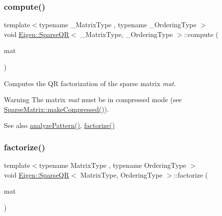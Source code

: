 \subsubsection{\texorpdfstring{compute()}{compute()}}
{\footnotesize\ttfamily template$<$typename \+\_\+\+Matrix\+Type , typename \+\_\+\+Ordering\+Type $>$ \\
void \mbox{\hyperlink{class_eigen_1_1_sparse_q_r}{Eigen\+::\+Sparse\+QR}}$<$ \+\_\+\+Matrix\+Type, \+\_\+\+Ordering\+Type $>$\+::compute (\begin{DoxyParamCaption}\item[{const Matrix\+Type \&}]{mat }\end{DoxyParamCaption})\hspace{0.3cm}{\ttfamily [inline]}}

Computes the QR factorization of the sparse matrix {\itshape mat}.

\begin{DoxyWarning}{Warning}
The matrix {\itshape mat} must be in compressed mode (see \mbox{\hyperlink{class_eigen_1_1_sparse_matrix_a5ff54ffc10296f9466dc81fa888733fd}{Sparse\+Matrix\+::make\+Compressed()}}).
\end{DoxyWarning}
\begin{DoxySeeAlso}{See also}
\mbox{\hyperlink{class_eigen_1_1_sparse_q_r_a4b425ddb1358c914d764cde48853a4f6}{analyze\+Pattern()}}, \mbox{\hyperlink{class_eigen_1_1_sparse_q_r_a55a34bacf05bd30a1dacbccad9f03c6d}{factorize()}} 
\end{DoxySeeAlso}
\mbox{\label{class_eigen_1_1_sparse_q_r_a55a34bacf05bd30a1dacbccad9f03c6d}} 
\subsubsection{\texorpdfstring{factorize()}{factorize()}}
{\footnotesize\ttfamily template$<$typename Matrix\+Type , typename Ordering\+Type $>$ \\
void \mbox{\hyperlink{class_eigen_1_1_sparse_q_r}{Eigen\+::\+Sparse\+QR}}$<$ Matrix\+Type, Ordering\+Type $>$\+::factorize (\begin{DoxyParamCaption}\item[{const Matrix\+Type \&}]{mat }\end{DoxyParamCaption})}



